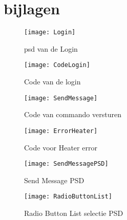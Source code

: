 \documentclass[11pt]{article}
\begin{document}
	\newpage
	
	\section{bijlagen}
	
	\begin{figure}[h]
		\texttt{[image: Login]}
		\caption{psd van de Login}
		\label{Login}
	\end{figure}
	\newpage
	\begin{figure}[h]
		\texttt{[image: CodeLogin]}
		\caption{Code van de login}
		\label{LoginCode}
	\end{figure}
	\newpage
	\begin{figure}[h]
		\texttt{[image: SendMessage]}
		\caption{Code van commando versturen}
		\label{SendMessage}
	\end{figure}
\newpage
\begin{figure}[h]
	\texttt{[image: ErrorHeater]}
	\caption{Code voor Heater error}
	\label{ErrorHeater}
\end{figure}
\newpage
\begin{figure}[h]
	\texttt{[image: SendMessagePSD]}
	\caption{Send Message PSD}
	\label{SendMessagePSD}
\end{figure}
\newpage
\begin{figure}[h]
	\texttt{[image: RadioButtonList]}
	\caption{Radio Button List selectie PSD}
	\label{RadioButtonList}
\end{figure}
\newpage
\end{document}
